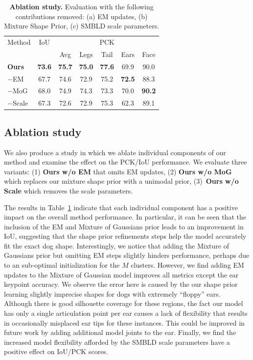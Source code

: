 \begin{table}
\begin{tabular}{@{}lcccccc@{}}
\toprule
\multicolumn{1}{l}{Method} & 
\multicolumn{1}{c}{IoU} & 
\multicolumn{5}{c}{PCK} \\
\multicolumn{2}{c}{} &
\multicolumn{1}{c}{Avg} &
\multicolumn{1}{c}{Legs} &
\multicolumn{1}{c}{Tail} &
\multicolumn{1}{c}{Ears} &
\multicolumn{1}{c}{Face} \\
\midrule
\textbf{Ours} & \textbf{73.6} & \textbf{75.7} & \textbf{75.0} & \textbf{77.6} & 69.9 & 90.0 \\
$-$EM & 67.7 & 74.6 & 72.9 & 75.2 & \textbf{72.5} & 88.3 \\
$-$MoG & 68.0 & 74.9 & 74.3 & 73.3 & 70.0 & \textbf{90.2} \\ 
$-$Scale & 67.3 & 72.6 & 72.9 & 75.3 & 62.3 & 89.1 \\
\bottomrule 
\end{tabular}
\caption{\label{tab:ablation}\textbf{Ablation study.} Evaluation with the following contributions removed: (a) EM updates, (b) Mixture Shape Prior, (c) SMBLD scale parameters.}
\end{table}


\subsection{Ablation study}

We also produce a study in which we ablate individual components of our method and examine the effect on the PCK/IoU performance. We evaluate three variants: (1) \textbf{Ours w/o EM} that omits EM updates, (2) \textbf{Ours w/o MoG} which replaces our mixture shape prior with a unimodal prior, (3)~\textbf{Ours w/o Scale} which removes the scale parameters. 

The results in Table~\ref{tab:ablation} indicate that each individual component has a positive impact on the overall method performance. In particular, it can be seen that the inclusion of the EM and Mixture of Gaussians prior leads to an improvement in IoU, suggesting that the shape prior refinements steps help the model accurately fit the exact dog shape. Interestingly, we notice that adding the Mixture of Gaussians prior but omitting EM steps slightly hinders performance, perhaps due to an sub-optimal initialization for the $M$ clusters. However, we find adding EM updates to the Mixture of Gaussian model improves all metrics except the ear keypoint accuracy. We observe the error here is caused by the our shape prior learning slightly imprecise shapes for dogs with extremely ``floppy'' ears. Although there is good silhouette coverage for these regions, the fact our model has only a single articulation point per ear causes a lack of flexibility that results in occasionally misplaced ear tips for these instances. This could be improved in future work by adding additional model joints to the ear. Finally, we find the increased model flexibility afforded by the SMBLD scale parameters have a positive effect on IoU/PCK scores. 



